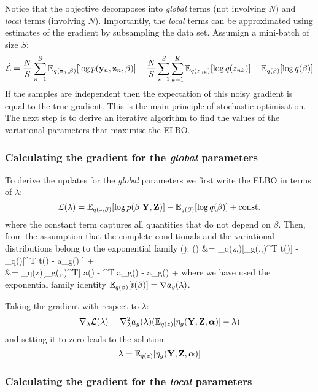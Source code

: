 Notice that the objective decomposes into \textit{global} terms (not involving $N$) and \textit{local} terms (involving $N$). Importantly, the \textit{local} terms can be approximated using estimates of the gradient by subsampling the data set. Assumign a mini-batch of size $S$:
\[
	\hat{\mathcal{L}} = \frac{N}{S} \sum_{n=1}^{S} \mathbb{E}_{q({\bf z}_n,\beta)}[\log p({\bf y}_n,{\bf z}_n,\beta)] - \frac{N}{S}\sum_{s=1}^{S} \sum_{k=1}^{K} \mathbb{E}_{q(z_{nk})}[\log q(z_{nk})] - \mathbb{E}_{q(\beta)}[\log q(\beta)]
\]
If the samples are independent then the expectation of this noisy gradient is equal to the true gradient. This is the main principle of stochastic optimisation. The next step is to derive an iterative algorithm to find the values of the variational parameters that maximise the ELBO.


\subsubsection{Calculating the gradient for the \textit{global} parameters}

To derive the updates for the \textit{global} parameters we first write the ELBO in terms of $\lambda$:
\[
	\mathcal{L}(\lambda) = \mathbb{E}_{q(z,\beta)}[\log p(\beta|{\bf Y},{\bf Z})] - \mathbb{E}_{q(\beta)}[\log q(\beta)] + {\rm const.}
\]
where the constant term captures all quantities that do not depend on $\beta$. Then, from the assumption that the complete conditionals and the variational distributions belong to the exponential family ():
\baln
	\Lagr(\lambda) &= \E_{q(z,\beta)}[\eta_g(\bfY,\bfZ,\balpha)^T t(\beta)] - \E_{q(\beta)}[\lambda^T t(\beta) - a_g(\lambda) ] + \const \\
	&= \E_{q(z)}[\eta_g(\bfY,\bfZ,\balpha)^T] \nabla a(\lambda) - \lambda^T \nabla a_g(\lambda) - a_g(\lambda) + \const
\ealn
where we have used the exponential family identity $\mathbb{E}_{q(\beta)}[t(\beta)] = \nabla a_g(\lambda)$.

Taking the gradient with respect to $\lambda$:
\begin{equation} \label{gradient_global}
	\nabla_{\lambda} \mathcal{L}(\lambda) = \nabla_{\lambda}^{2} a_g(\lambda)(\mathbb{E}_{q(z)}[\eta_g({\bf Y},{\bf Z},\mbox{\boldmath $\alpha$})] - \lambda)
\end{equation}
and setting it to zero leads to the solution:
\begin{equation} \label{solution_global}
	\lambda = \mathbb{E}_{q(z)}[\eta_g({\bf Y},{\bf Z},\mbox{\boldmath $\alpha$})]
\end{equation}


\subsubsection{Calculating the gradient for the \textit{local} parameters}

